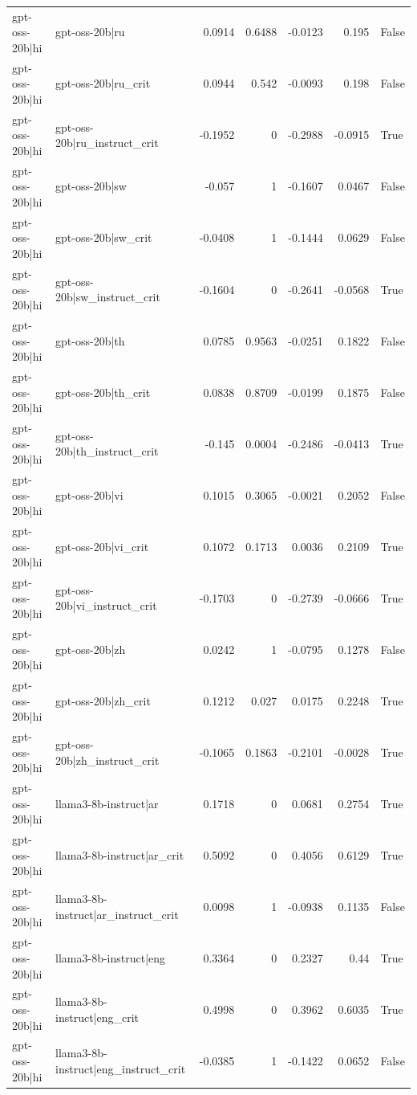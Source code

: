 \begin{table}
\begin{tabular}{l l r r r r l}
gpt-oss-20b|hi & gpt-oss-20b|ru & 0.0914 & 0.6488 & -0.0123 & 0.195 & False \\
gpt-oss-20b|hi & gpt-oss-20b|ru_crit & 0.0944 & 0.542 & -0.0093 & 0.198 & False \\
gpt-oss-20b|hi & gpt-oss-20b|ru_instruct_crit & -0.1952 & 0 & -0.2988 & -0.0915 & True \\
gpt-oss-20b|hi & gpt-oss-20b|sw & -0.057 & 1 & -0.1607 & 0.0467 & False \\
gpt-oss-20b|hi & gpt-oss-20b|sw_crit & -0.0408 & 1 & -0.1444 & 0.0629 & False \\
gpt-oss-20b|hi & gpt-oss-20b|sw_instruct_crit & -0.1604 & 0 & -0.2641 & -0.0568 & True \\
gpt-oss-20b|hi & gpt-oss-20b|th & 0.0785 & 0.9563 & -0.0251 & 0.1822 & False \\
gpt-oss-20b|hi & gpt-oss-20b|th_crit & 0.0838 & 0.8709 & -0.0199 & 0.1875 & False \\
gpt-oss-20b|hi & gpt-oss-20b|th_instruct_crit & -0.145 & 0.0004 & -0.2486 & -0.0413 & True \\
gpt-oss-20b|hi & gpt-oss-20b|vi & 0.1015 & 0.3065 & -0.0021 & 0.2052 & False \\
gpt-oss-20b|hi & gpt-oss-20b|vi_crit & 0.1072 & 0.1713 & 0.0036 & 0.2109 & True \\
gpt-oss-20b|hi & gpt-oss-20b|vi_instruct_crit & -0.1703 & 0 & -0.2739 & -0.0666 & True \\
gpt-oss-20b|hi & gpt-oss-20b|zh & 0.0242 & 1 & -0.0795 & 0.1278 & False \\
gpt-oss-20b|hi & gpt-oss-20b|zh_crit & 0.1212 & 0.027 & 0.0175 & 0.2248 & True \\
gpt-oss-20b|hi & gpt-oss-20b|zh_instruct_crit & -0.1065 & 0.1863 & -0.2101 & -0.0028 & True \\
gpt-oss-20b|hi & llama3-8b-instruct|ar & 0.1718 & 0 & 0.0681 & 0.2754 & True \\
gpt-oss-20b|hi & llama3-8b-instruct|ar_crit & 0.5092 & 0 & 0.4056 & 0.6129 & True \\
gpt-oss-20b|hi & llama3-8b-instruct|ar_instruct_crit & 0.0098 & 1 & -0.0938 & 0.1135 & False \\
gpt-oss-20b|hi & llama3-8b-instruct|eng & 0.3364 & 0 & 0.2327 & 0.44 & True \\
gpt-oss-20b|hi & llama3-8b-instruct|eng_crit & 0.4998 & 0 & 0.3962 & 0.6035 & True \\
gpt-oss-20b|hi & llama3-8b-instruct|eng_instruct_crit & -0.0385 & 1 & -0.1422 & 0.0652 & False \\

\end{tabular}
\end{table}
